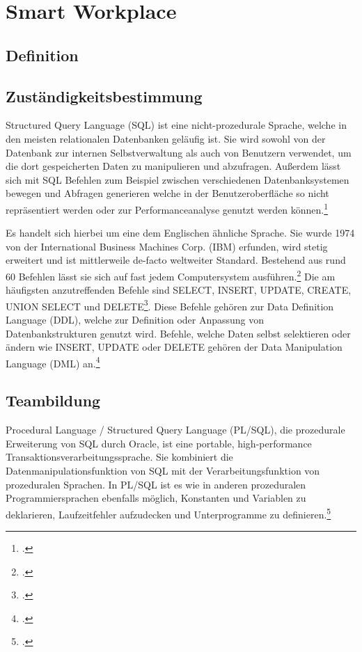 \newpage
\section{Smart Workplace}
\subsection{Definition}


\subsection{Zuständigkeitsbestimmung}
Structured Query Language (SQL) ist eine nicht-prozedurale Sprache, welche in den meisten relationalen Datenbanken geläufig ist. Sie wird sowohl von der Datenbank zur internen Selbstverwaltung als auch von Benutzern verwendet, um die dort gespeicherten Daten zu manipulieren und abzufragen. Außerdem lässt sich mit SQL Befehlen zum Beispiel zwischen verschiedenen Datenbanksystemen bewegen und Abfragen generieren welche in der Benutzeroberfläche so nicht repräsentiert werden oder zur Performanceanalyse genutzt werden können.\footcite[Vgl.][]{UniversityofDelaware}

Es handelt sich hierbei um eine dem Englischen ähnliche Sprache. Sie wurde 1974 von der International Business Machines Corp. (IBM) erfunden, wird stetig erweitert und ist mittlerweile de-facto weltweiter Standard. Bestehend aus rund 60 Befehlen lässt sie sich auf fast jedem Computersystem ausführen.\footcite[Vgl.][]{BusinessDictionary}
Die am häufigsten anzutreffenden Befehle sind SELECT, INSERT, UPDATE, CREATE, UNION SELECT und DELETE\footcite[Vgl.][Seite 486]{OlearySteele}.
Diese Befehle gehören zur Data Definition Language (DDL), welche zur Definition oder Anpassung von Datenbankstrukturen genutzt wird. Befehle, welche Daten selbst selektieren oder ändern wie INSERT, UPDATE oder DELETE gehören der Data Manipulation Language (DML) an.\footcite[Vgl.][]{UniversityofDelaware}

\subsection{Teambildung}
Procedural Language / Structured Query Language (PL/SQL), die prozedurale Erweiterung von SQL durch Oracle, ist eine portable, high-performance Transaktionsverarbeitungssprache. Sie kombiniert die Datenmanipulationsfunktion von SQL mit der Verarbeitungsfunktion von prozeduralen Sprachen. In PL/SQL ist es wie in anderen prozeduralen Programmiersprachen ebenfalls möglich, Konstanten und Variablen zu deklarieren, Laufzeitfehler aufzudecken und Unterprogramme zu definieren.\footcite[Vgl.][Seite 1-1 ff]{oracle}

